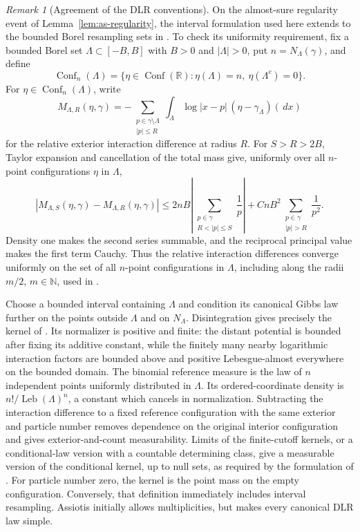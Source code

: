 \documentclass[11pt,reqno]{amsart}
\numberwithin{equation}{section}
\theoremstyle{definition}
\theoremstyle{remark}
\newtheorem{remark}[theorem]{Remark}
\newcommand{\R}{\mathbb R}
\newcommand{\N}{\mathbb N}
\newcommand{\1}{\mathbf 1}
\newcommand{\Conf}{\operatorname{Conf}}
\newcommand{\Leb}{\operatorname{Leb}}
\newcommand{\dd}{\,d}
\begin{document}
\begin{remark}[Agreement of the DLR conventions]\label{rem:dlr-conventions}
On the almost-sure regularity event of Lemma~\ref{lem:as-regularity},
the interval formulation used here extends to the bounded Borel
resampling sets in \cite[Definitions~2.1--2.2]{Assiotis}.
To check its uniformity requirement, fix a bounded Borel set
$\Lambda\subset[-B,B]$ with $B>0$ and $|\Lambda|>0$, put
$n=N_\Lambda(\gamma)$, and define
\[
\Conf_n(\Lambda)=\{\eta\in\Conf(\R):
                 \eta(\Lambda)=n,\ \eta(\Lambda^c)=0\}.
\]
For $\eta\in\Conf_n(\Lambda)$, write
\[
M_{\Lambda,R}(\eta,\gamma)
=-\sum_{\substack{p\in\gamma\setminus\Lambda\\|p|\le R}}
\int_\Lambda\log|x-p|\,(\eta-\gamma_\Lambda)(\dd x)
\]
for the relative exterior interaction difference at radius $R$.
For $S>R>2B$, Taylor expansion and cancellation of the total mass give,
uniformly over all $n$-point configurations $\eta$ in $\Lambda$,
\[
|M_{\Lambda,S}(\eta,\gamma)-M_{\Lambda,R}(\eta,\gamma)|
\le 2nB\left|\sum_{\substack{p\in\gamma\\R<|p|\le S}}\frac1p\right|
+CnB^2\sum_{\substack{p\in\gamma\\|p|>R}}\frac1{p^2}.
\]
Density one makes the second series summable, and the reciprocal
principal value makes the first term Cauchy. Thus the relative interaction differences converge
uniformly on the set of all $n$-point configurations in $\Lambda$, including along the radii $m/2$, $m\in\N$, used
in \cite{Assiotis}.

Choose a bounded interval containing $\Lambda$ and condition its
canonical Gibbs law further on the points outside $\Lambda$ and on
$N_\Lambda$. Disintegration gives precisely the kernel of
\cite[Definition~2.1]{Assiotis}. Its normalizer is positive and finite:
the distant potential is bounded after fixing its additive constant,
while the finitely many nearby logarithmic interaction factors are
bounded above and positive Lebesgue-almost everywhere on the bounded
domain. The binomial reference measure is the law of $n$ independent points
uniformly distributed in $\Lambda$. Its ordered-coordinate density is
$n!/\Leb(\Lambda)^n$, a constant which cancels in normalization. Subtracting the interaction difference to a
fixed reference configuration with the same exterior and particle number removes dependence on the
original interior configuration and gives exterior-and-count
measurability. Limits of the finite-cutoff kernels, or a conditional-law
version with a countable determining class, give a measurable version of the conditional kernel, up to null sets,
as required by the formulation of \cite[Definition~2.2]{Assiotis}. For particle number zero, the kernel is the point mass on the empty
configuration. Conversely, that definition immediately includes
interval resampling. Assiotis initially allows multiplicities, but
\cite[Lemma~2.8]{Assiotis} makes every canonical DLR law simple.


\end{remark}
\end{document}
